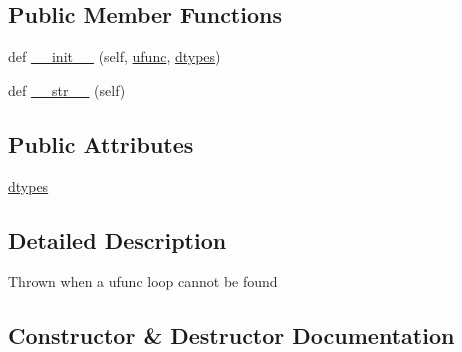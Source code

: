 \subsection*{Public Member Functions}
\begin{DoxyCompactItemize}
\item 
def \hyperlink{classnumpy_1_1core_1_1__exceptions_1_1__UFuncNoLoopError_aed8122b4d9947137eacac0438f1e9365}{\+\_\+\+\_\+init\+\_\+\+\_\+} (self, \hyperlink{classnumpy_1_1core_1_1__exceptions_1_1UFuncTypeError_a10866e4bfc9971e5aa77e8cd1c9e04f4}{ufunc}, \hyperlink{classnumpy_1_1core_1_1__exceptions_1_1__UFuncNoLoopError_aa309ec1c6ae5fd42717701b694514133}{dtypes})
\item 
def \hyperlink{classnumpy_1_1core_1_1__exceptions_1_1__UFuncNoLoopError_a94f6d72d6c8ac990f9ee750fa3d1565c}{\+\_\+\+\_\+str\+\_\+\+\_\+} (self)
\end{DoxyCompactItemize}
\subsection*{Public Attributes}
\begin{DoxyCompactItemize}
\item 
\hyperlink{classnumpy_1_1core_1_1__exceptions_1_1__UFuncNoLoopError_aa309ec1c6ae5fd42717701b694514133}{dtypes}
\end{DoxyCompactItemize}


\subsection{Detailed Description}
\begin{DoxyVerb}Thrown when a ufunc loop cannot be found \end{DoxyVerb}
 

\subsection{Constructor \& Destructor Documentation}
\mbox{\label{classnumpy_1_1core_1_1__exceptions_1_1__UFuncNoLoopError_aed8122b4d9947137eacac0438f1e9365}} 
